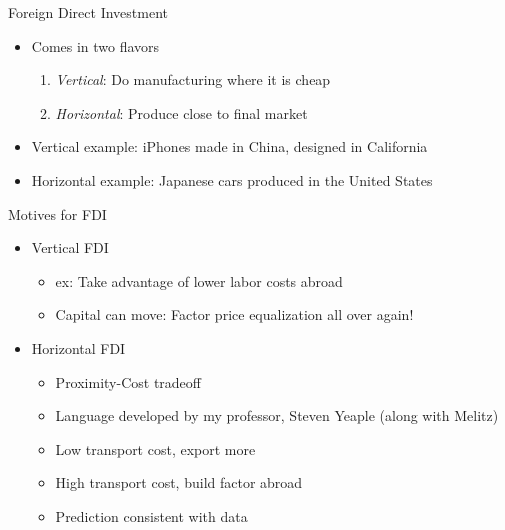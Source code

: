 \documentclass{beamer}
\begin{document}
\begin{frame}{Foreign Direct Investment}

    \begin{itemize}
        \item Comes in two flavors
        \begin{enumerate}
            \item \emph{Vertical}: Do manufacturing where it is cheap
            \item \emph{Horizontal}: Produce close to final market
        \end{enumerate}
        \item Vertical example: iPhones made in China, designed in California
        \item Horizontal example: Japanese cars produced in the United States
    \end{itemize}

\end{frame}

\begin{frame}{Motives for FDI}
    \begin{itemize}
        \item Vertical FDI
        \begin{itemize}
            \item ex: Take advantage of lower labor costs abroad
            \item Capital can move: Factor price equalization all over again!
        \end{itemize}
        \item Horizontal FDI
        \begin{itemize}
            \item Proximity-Cost tradeoff
            \item Language developed by my professor, Steven Yeaple (along with Melitz)
            \item Low transport cost, export more
            \item High transport cost, build factor abroad
            \item Prediction consistent with data
        \end{itemize}
    \end{itemize}
\end{frame}
\end{document}
